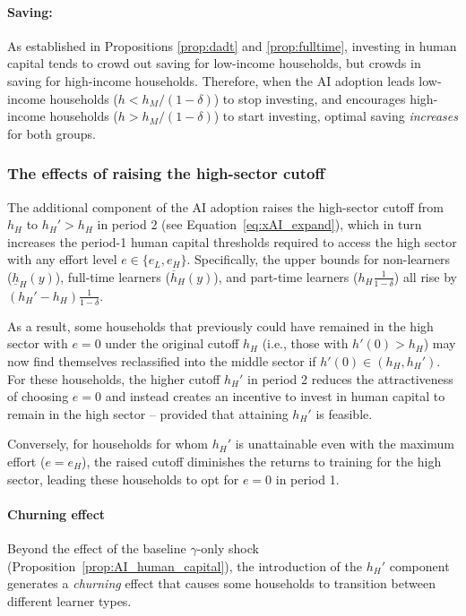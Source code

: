 \documentclass[12pt,english]{article}
\numberwithin{equation}{section}
\let\originaleqref\eqref
\renewcommand{\eqref}{Equation~\originaleqref}
\begin{document}
\paragraph{Saving:} As established in Propositions \ref{prop:dadt} and \ref{prop:fulltime}, investing in human capital tends to crowd out saving for low-income households, but crowds in saving for high-income households. Therefore, when the AI adoption leads low-income households ($h < h_M/(1-\delta)$) to stop investing, and encourages high-income households ($h > h_M/(1-\delta)$) to start investing, optimal saving \emph{increases} for both groups. 



\subsubsection{The effects of raising the high-sector cutoff}\label{sec:AI_raising_high_sector_cutoff}
The additional component of the AI adoption raises the high-sector cutoff from $h_H$ to $h_H'>h_H$ in period 2 (see \eqref{eq:xAI_expand}), which in turn increases the period-1 human capital thresholds required to access the high sector with any effort level $e \in \{e_L, e_H\}$. Specifically, the upper bounds for non-learners ($\underline{h}_H(y)$), full-time learners ($\overline{h}_H(y)$), and part-time learners ($h_H\frac{1}{1-\delta}$) all rise by $(h_H' - h_H)\frac{1}{1-\delta}$.

As a result, some households that previously could have remained in the high sector with $e=0$ under the original cutoff $h_H$ (i.e., those with $h'(0) > h_H$) may now find themselves reclassified into the middle sector if $h'(0) \in (h_H, h_H')$. For these households, the higher cutoff $h_H'$ in period 2 reduces the attractiveness of choosing $e=0$ and instead creates an incentive to invest in human capital to remain in the high sector -- provided that attaining $h_H'$ is feasible.

Conversely, for households for whom $h_H'$ is unattainable even with the maximum effort ($e = e_H$), the raised cutoff diminishes the returns to training for the high sector, leading these households to opt for $e=0$ in period 1.

\paragraph{Churning effect}
Beyond the effect of the baseline $\gamma$-only shock (Proposition~\ref{prop:AI_human_capital}), the introduction of the $h_H'$ component generates a \textit{churning} effect that causes some households to transition between different learner types.
\end{document}
